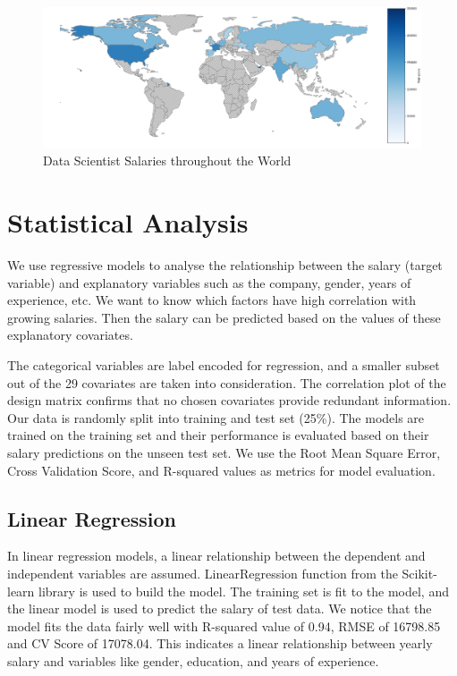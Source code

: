 \documentclass{article}
\begin{document}
\begin{figure}
    \centering
    \includegraphics[width=1.05\linewidth]{NeurIPS_style/figures/world_map.png}
    \caption{Data Scientist Salaries throughout the World}
    \label{fig:world_map}
\end{figure}

\section{Statistical Analysis}
We use regressive models to analyse the relationship between the salary (target variable) and explanatory variables such as the company, gender, years of experience, etc. We want to know which factors have high correlation with growing salaries. Then the salary can be predicted based on the values of these explanatory covariates.

The categorical variables are label encoded for regression, and a smaller subset out of the 29 covariates are taken into consideration. The correlation plot of the design matrix confirms that no chosen covariates provide redundant information. Our data is randomly split into training and test set (25\%). The models are trained on the training set and their performance is evaluated based on their salary predictions on the unseen test set. We use the Root Mean Square Error, Cross Validation Score, and R-squared values as metrics for model evaluation. 

\subsection{Linear Regression}
In linear regression models, a linear relationship between the dependent and independent variables are assumed. LinearRegression function from the Scikit-learn library is used to build the model. The training set is fit to the model, and the linear model is used to predict the salary of test data. We notice that the model fits the data fairly well with R-squared value of 0.94, RMSE of 16798.85 and CV Score of 17078.04. This indicates a linear relationship between yearly salary and variables like gender, education, and years of experience.
\end{document}
